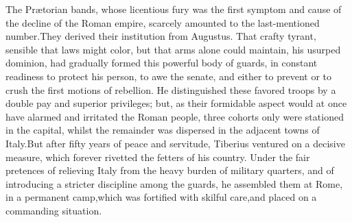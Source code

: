 The Prætorian bands, whose licentious fury was the first symptom
and cause of the decline of the Roman empire, scarcely amounted
to the last-mentioned number.\footnotemark[1] They derived their institution
from Augustus. That crafty tyrant, sensible that laws might
color, but that arms alone could maintain, his usurped dominion,
had gradually formed this powerful body of guards, in constant
readiness to protect his person, to awe the senate, and either to
prevent or to crush the first motions of rebellion. He
distinguished these favored troops by a double pay and superior
privileges; but, as their formidable aspect would at once have
alarmed and irritated the Roman people, three cohorts only were
stationed in the capital, whilst the remainder was dispersed in
the adjacent towns of Italy.\footnotemark[2] But after fifty years of peace and
servitude, Tiberius ventured on a decisive measure, which forever
rivetted the fetters of his country. Under the fair pretences of
relieving Italy from the heavy burden of military quarters, and
of introducing a stricter discipline among the guards, he
assembled them at Rome, in a permanent camp,\footnotemark[3] which was
fortified with skilful care,\footnotemark[4] and placed on a commanding
situation.\footnotemark[5]






